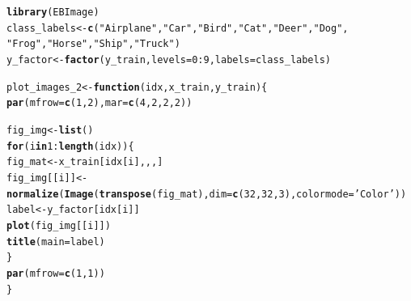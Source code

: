 \documentclass[10pt, a4paper, english]{article}\usepackage[]{graphicx}\usepackage[dvipsnames]{xcolor}
\makeatletter
\newcommand{\hlnum}[1]{\textcolor[rgb]{0.686,0.059,0.569}{#1}}%
\newcommand{\hlstr}[1]{\textcolor[rgb]{0.192,0.494,0.8}{#1}}%
\newcommand{\hlopt}[1]{\textcolor[rgb]{0,0,0}{#1}}%
\newcommand{\hlstd}[1]{\textcolor[rgb]{0.345,0.345,0.345}{#1}}%
\newcommand{\hlkwa}[1]{\textcolor[rgb]{0.161,0.373,0.58}{\textbf{#1}}}%
\newcommand{\hlkwb}[1]{\textcolor[rgb]{0.69,0.353,0.396}{#1}}%
\newcommand{\hlkwc}[1]{\textcolor[rgb]{0.333,0.667,0.333}{#1}}%
\newcommand{\hlkwd}[1]{\textcolor[rgb]{0.737,0.353,0.396}{\textbf{#1}}}%
\newenvironment{kframe}{%
 \def\at@end@of@kframe{}%
 \ifinner\ifhmode%
  \def\at@end@of@kframe{\end{minipage}}%
  \begin{minipage}{\columnwidth}%
 \fi\fi%
 \def\FrameCommand##1{\hskip\@totalleftmargin \hskip-\fboxsep
 \colorbox{shadecolor}{##1}\hskip-\fboxsep
     \hskip-\linewidth \hskip-\@totalleftmargin \hskip\columnwidth}%
 \MakeFramed {\advance\hsize-\width
   \@totalleftmargin\z@ \linewidth\hsize
   \@setminipage}}%
 {\par\unskip\endMakeFramed%
 \at@end@of@kframe}
\newenvironment{knitrout}{}{} %
\makeatother
\begin{document}
\begin{knitrout}
\color{fgcolor}\begin{kframe}
\begin{alltt}
\hlkwd{library}\hlstd{(EBImage)}
\hlstd{class_labels} \hlkwb{<-} \hlkwd{c}\hlstd{(}\hlstr{"Airplane"}\hlstd{,} \hlstr{"Car"}\hlstd{,} \hlstr{"Bird"}\hlstd{,} \hlstr{"Cat"}\hlstd{,} \hlstr{"Deer"}\hlstd{,} \hlstr{"Dog"}\hlstd{,}
                  \hlstr{"Frog"}\hlstd{,} \hlstr{"Horse"}\hlstd{,} \hlstr{"Ship"}\hlstd{,} \hlstr{"Truck"}\hlstd{)}
\hlstd{y_factor} \hlkwb{<-} \hlkwd{factor}\hlstd{(y_train,} \hlkwc{levels} \hlstd{=} \hlnum{0}\hlopt{:}\hlnum{9}\hlstd{,} \hlkwc{labels} \hlstd{= class_labels)}

\hlstd{plot_images_2} \hlkwb{<-} \hlkwa{function}\hlstd{(}\hlkwc{idx}\hlstd{,} \hlkwc{x_train}\hlstd{,} \hlkwc{y_train}\hlstd{)\{}
  \hlkwd{par}\hlstd{(}\hlkwc{mfrow}\hlstd{=}\hlkwd{c}\hlstd{(}\hlnum{1}\hlstd{,}\hlnum{2}\hlstd{),} \hlkwc{mar} \hlstd{=} \hlkwd{c}\hlstd{(}\hlnum{4}\hlstd{,} \hlnum{2}\hlstd{,} \hlnum{2}\hlstd{,} \hlnum{2}\hlstd{))}

  \hlstd{fig_img} \hlkwb{<-} \hlkwd{list}\hlstd{()}
  \hlkwa{for} \hlstd{(i} \hlkwa{in} \hlnum{1}\hlopt{:}\hlkwd{length}\hlstd{(idx))\{}
    \hlstd{fig_mat} \hlkwb{<-} \hlstd{x_train[idx[i],,,]}
    \hlstd{fig_img[[i]]} \hlkwb{<-} \hlkwd{normalize}\hlstd{(}\hlkwd{Image}\hlstd{(}\hlkwd{transpose}\hlstd{(fig_mat),} \hlkwc{dim}\hlstd{=}\hlkwd{c}\hlstd{(}\hlnum{32}\hlstd{,}\hlnum{32}\hlstd{,}\hlnum{3}\hlstd{),} \hlkwc{colormode}\hlstd{=}\hlstr{'Color'}\hlstd{))}
    \hlstd{label} \hlkwb{<-} \hlstd{y_factor[idx[i]]}
    \hlkwd{plot}\hlstd{(fig_img[[i]])}
    \hlkwd{title}\hlstd{(}\hlkwc{main}\hlstd{=label)}
  \hlstd{\}}
  \hlkwd{par}\hlstd{(}\hlkwc{mfrow}\hlstd{=}\hlkwd{c}\hlstd{(}\hlnum{1}\hlstd{,}\hlnum{1}\hlstd{))}
\hlstd{\}}
\end{alltt}
\end{kframe}
\end{knitrout}
\end{document}

